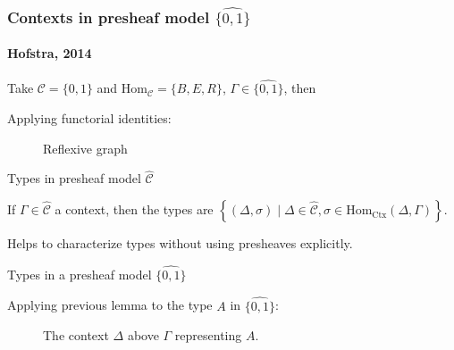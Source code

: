 \documentclass[english]{beamer}
\newcommand{\fig}[2]{
    \begin{figure}\begin{center}\texttt{[image: figures/\#1]}\caption{#2\label{#1}}\end{center}
    \end{figure}}
\newcommand{\tcol}[2]{
    \begin{columns}
        \column{.5\textwidth}
        #1
        \column{.5\textwidth}
        #2
    \end{columns}
}
\begin{document}
   \begin{frame}[fragile]
   \frametitle{Contexts in presheaf model $\widehat{\{0,1\}}$}
\framesubtitle{Hofstra, 2014}
    \begin{example}    
    Take $\mathcal{C} = \{0,1\}$ and $\text{Hom}_{\mathcal{C}}= \{B,E,R\}$, $\Gamma \in \widehat{\{0,1\}}$, then 
    
   
    
    Applying functorial identities:
    \begin{figure}
    \begin{centering}
        
    \end{centering}
    \caption{Reflexive graph}
    \end{figure}
   \end{example} 
\end{frame}

\begin{frame}{Types in  presheaf model $\widehat{\mathcal{C}}$}
    
    
    \begin{lemma}
        If $\Gamma \in \widehat{\mathcal{C}}$ a context, then the types are $ \left\{ (\Delta, \sigma) \mid \Delta \in \widehat{\mathcal{C}}, \sigma \in \text{Hom}_{\text{Ctx}}(\Delta , \Gamma) \right\}$.
     \end{lemma}

     
     Helps to characterize types without using presheaves explicitly.
\end{frame}


\begin{frame}{Types in a presheaf model $\widehat{\{0, 1 \}}$}
  \begin{example}
  Applying previous lemma to the type $A$ in $\widehat{\{0, 1 \}}$:
\begin{figure}
\centering
  
  \caption{The context $\Delta$ above $\Gamma$ representing $A$.}
  \end{figure}
 \end{example}


\end{frame}
\end{document}
